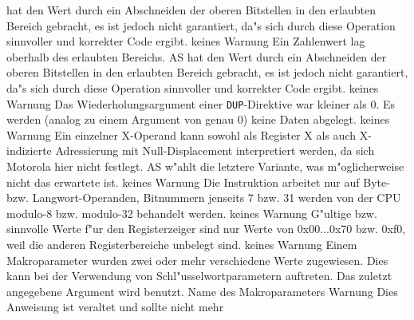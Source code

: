 \documentclass[12pt,a4paper,twoside]{report}
\newcommand{\tty}[1]{{\tt #1}}
\newcommand{\asname}{AS}
\begin{document}
\begin{description}
{                hat den Wert durch ein Abschneiden der oberen Bitstellen
                in den erlaubten Bereich gebracht, es ist jedoch nicht
                garantiert, da"s sich durch diese Operation sinnvoller und
                korrekter Code ergibt.}
               {keines}
               {Warnung}
               {Ein Zahlenwert lag oberhalb des erlaubten Bereichs.  \asname{}
                hat den Wert durch ein Abschneiden der oberen Bitstellen
                in den erlaubten Bereich gebracht, es ist jedoch nicht
                garantiert, da"s sich durch diese Operation sinnvoller und
                korrekter Code ergibt.}
               {keines}
               {Warnung}
               {Das Wiederholungsargument einer \tty{DUP}-Direktive war
                kleiner als 0.  Es werden (analog zu einem Argument von
                genau 0) keine Daten abgelegt.}
               {keines}
               {Warnung}
               {Ein einzelner X-Operand kann sowohl als Register X als
                auch X-indizierte Adressierung mit Null-Displacement
                interpretiert werden, da sich Motorola hier nicht festlegt.
                \asname{} w"ahlt die letztere Variante, was m"oglicherweise nicht
                das erwartete ist.}
               {keines}
               {Warnung}
               {Die Instruktion arbeitet nur auf Byte- bzw.
                Langwort-Operanden, Bitnummern jenseits 7 bzw. 31 werden
                von der CPU modulo-8 bzw. modulo-32 behandelt werden.}
               {keines}
               {Warnung}
               {G"ultige bzw. sinnvolle Werte f"ur den Registerzeiger sind
                nur Werte von 0x00...0x70 bzw. 0xf0, weil die anderen
                Registerbereiche unbelegt sind.}
               {keines}
               {Warnung}
               {Einem Makroparameter wurden zwei oder mehr
                verschiedene Werte zugewiesen.  Dies kann bei der
                Verwendung von Schl"usselwortparametern auftreten.
                Das zuletzt angegebene Argument wird benutzt.}
               {Name des Makroparameters}
               {Warnung}
               {Dies Anweisung ist veraltet und sollte nicht mehr
}
\end{description}
\end{document}

